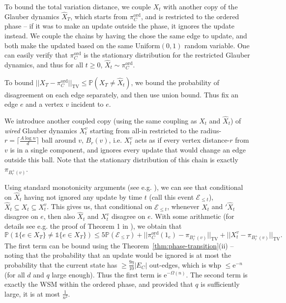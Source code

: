 \documentclass[11pt]{article}
\theoremstyle{plain}
\newcommand{\emm}{\mathrm{e}}
\newcommand{\Ec}{\mathcal{E}}
\renewcommand{\P}{\mathds{P}}
\newcommand{\TV}{\mathrm{TV}}
\newcommand{\1}{\mathbb{1}}
\newcommand{\ord}{\mathrm{ord}}
\begin{document}
To bound the total variation distance, we couple \(X_t\) with another copy of the Glauber dynamics \(\hat X_T\), which starts from \(\pi_C^\ord\), and is restricted to the ordered phase -- if it was to make an update outside the phase, it ignores the update instead. We couple the chains by having the chose the same edge to update, and both make the updated based on the same \(\text{Uniform}(0,1)\) random variable. One can easily verify that \(\pi_C^\ord\) is the stationary distribution for the restricted Glauber dynamics, and thus for all \(t\geq 0\), \(\hat X_t\sim\pi_C^\ord\).

To bound \(||X_T-\pi^\ord_C||_\TV\leq \P(X_T\neq \hat X_t)\), we bound the probability of disagreement on each edge separately, and then use union bound. Thus fix an edge \(e\) and a vertex \(v\) incident to \(e\).

We introduce another coupled copy (using the same coupling as \(X_t\) and \(\hat X_t\)) of \textit{wired} Glauber dynamics \(X_t^v\) starting from all-in restricted to the radius-\(r = \lceil\frac{A\log n}{d}\rceil\) ball around \(v\), \(B_r(v)\), i.e. \(X_t^v\) acts as if every vertex distance-\(r\) from \(v\) is in a single component, and ignores every update that would change an edge outside this ball. Note that the stationary distribution of this chain is exactly \(\pi_{B_r^+(v)}\).

Using standard monotonicity arguments (see e.g. \cite[Appendix B]{Galanis_Goldberg_Smolarova_2024}), we can see that conditional on \(\hat X_t\) having not ignored any update by time \(t\) (call this event \(\Ec_{\leq t}\)), \(\hat X_t \subseteq X_t\subseteq X_t^v\). This gives us, that conditional on \(\Ec_{\leq t}\), whenever \(X_t\) and \('\hat X_t\) disagree on \(e\), then also \(\hat X_t\) and \(X_t^v\) disagree on \(e\). With some arithmetic (for details see e.g. the proof of Theorem 1 in \cite{Galanis_Goldberg_Smolarova_2024}), we obtain that 
\[
\P(\1\{e\in X_T\}\neq \1\{e\in X_T\})\leq 5\P(\Ec_{\leq T}) + ||\pi^\ord_C(1_e) - \pi_{B_r^+(v)}||_\TV + ||X_t^v-\pi_{B_r^+(v)}||_\TV.
\]
The first term can be bound using the Theorem~\ref{thm:phase-transition}(ii) -- noting that the probability that an update would be ignored is at most the probability that the current state has \(\geq\frac{9\eta}{10}|E_C|\) out-edges, which is whp \(\leq \emm^{-n}\) (for all \(d\) and \(q\) large enough). Thus the first term is \(\emm^{-\Omega(n)}\). The second term is exactly the WSM within the ordered phase, and provided that \(q\) is sufficiently large, it is at most \(\tfrac{1}{n^2}\). 
\end{document}
